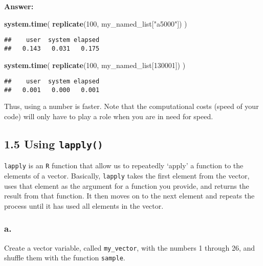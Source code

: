 \documentclass[]{article}
\newenvironment{Shaded}{\begin{snugshade}}{\end{snugshade}}
\newcommand{\DecValTok}[1]{\textcolor[rgb]{0.00,0.00,0.81}{#1}}
\newcommand{\KeywordTok}[1]{\textcolor[rgb]{0.13,0.29,0.53}{\textbf{#1}}}
\newcommand{\NormalTok}[1]{#1}
\newcommand{\StringTok}[1]{\textcolor[rgb]{0.31,0.60,0.02}{#1}}
\begin{document}
\textbf{Answer:}

\begin{Shaded}
\begin{Highlighting}[]
\KeywordTok{system.time}\NormalTok{(}
  \KeywordTok{replicate}\NormalTok{(}\DecValTok{100}\NormalTok{, my_named_list[}\StringTok{"a5000"}\NormalTok{])}
\NormalTok{)}
\end{Highlighting}
\end{Shaded}

\begin{verbatim}
##    user  system elapsed 
##   0.143   0.031   0.175
\end{verbatim}

\begin{Shaded}
\begin{Highlighting}[]
\KeywordTok{system.time}\NormalTok{(}
  \KeywordTok{replicate}\NormalTok{(}\DecValTok{100}\NormalTok{, my_named_list[}\DecValTok{130001}\NormalTok{])}
\NormalTok{)}
\end{Highlighting}
\end{Shaded}

\begin{verbatim}
##    user  system elapsed 
##   0.001   0.000   0.001
\end{verbatim}

Thus, using a number is faster. Note that the computational costs (speed
of your code) will only have to play a role when you are in need for
speed.

\hypertarget{using-lapply}{%
\subsection{\texorpdfstring{1.5 Using
\texttt{lapply()}}{1.5 Using lapply()}}\label{using-lapply}}

\texttt{lapply} is an \texttt{R} function that allow us to repeatedly
`apply' a function to the elements of a vector. Basically,
\texttt{lapply} takes the first element from the vector, uses that
element as the argument for a function you provide, and returns the
result from that function. It then moves on to the next element and
repeats the process until it has used all elements in the vector.

\hypertarget{a.-3}{%
\subsubsection{a.}\label{a.-3}}

Create a vector variable, called \texttt{my\_vector}, with the numbers 1
through 26, and shuffle them with the function \texttt{sample}.
\end{document}
